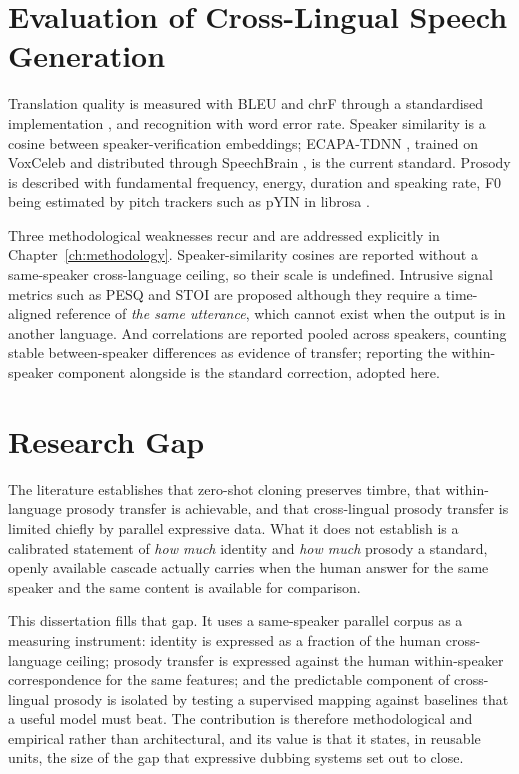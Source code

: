\section{Evaluation of Cross-Lingual Speech Generation}
\label{sec:lit_eval}

Translation quality is measured with BLEU \cite{papineni2002bleu} and chrF
\cite{popovic2015chrf} through a standardised implementation \cite{post2018sacrebleu}, and
recognition with word error rate. Speaker similarity is a cosine between speaker-verification
embeddings; ECAPA-TDNN \cite{desplanques2020ecapa}, trained on VoxCeleb \cite{nagrani2017voxceleb}
and distributed through SpeechBrain \cite{ravanelli2021speechbrain}, is the current standard.
Prosody is described with fundamental frequency, energy, duration and speaking rate, F0 being
estimated by pitch trackers such as pYIN \cite{mauch2014pyin} in librosa \cite{mcfee2015librosa}.

Three methodological weaknesses recur and are addressed explicitly in
Chapter~\ref{ch:methodology}. Speaker-similarity cosines are reported without a same-speaker
cross-language ceiling, so their scale is undefined. Intrusive signal metrics such as PESQ and STOI
are proposed although they require a time-aligned reference of \emph{the same utterance}, which
cannot exist when the output is in another language. And correlations are reported pooled across
speakers, counting stable between-speaker differences as evidence of transfer; reporting the
within-speaker component alongside is the standard correction, adopted here.

\section{Research Gap}
\label{sec:gap}

The literature establishes that zero-shot cloning preserves timbre, that within-language prosody
transfer is achievable, and that cross-lingual prosody transfer is limited chiefly by parallel
expressive data. What it does not establish is a calibrated statement of \emph{how much} identity
and \emph{how much} prosody a standard, openly available cascade actually carries when the human
answer for the same speaker and the same content is available for comparison.

This dissertation fills that gap. It uses a same-speaker parallel corpus as a measuring instrument:
identity is expressed as a fraction of the human cross-language ceiling; prosody transfer is
expressed against the human within-speaker correspondence for the same features; and the
predictable component of cross-lingual prosody is isolated by testing a supervised mapping against
baselines that a useful model must beat. The contribution is therefore methodological and
empirical rather than architectural, and its value is that it states, in reusable units, the size
of the gap that expressive dubbing systems set out to close.
